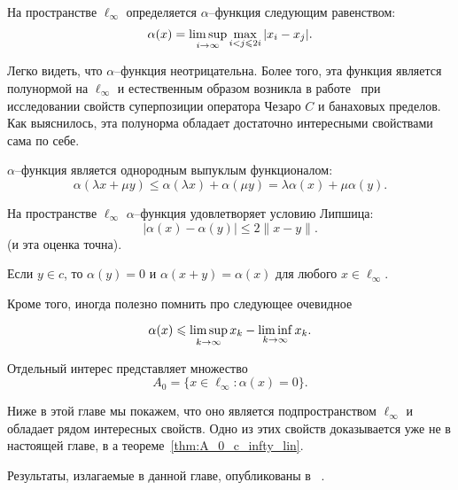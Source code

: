 На пространстве $\ell_\infty$ определяется $\alpha$--функция следующим равенством:
\begin{equation}
	\alpha(x) = \varlimsup_{i\to\infty} \max_{i<j\leqslant 2i} |x_i - x_j|
	.
\end{equation}

Легко видеть, что $\alpha$--функция неотрицательна.
Более того, эта функция является полунормой на $\ell_\infty$
и естественным образом возникла в работе~\cite[\S 2]{semenov2020invariant_noncommutative}
при исследовании свойств суперпозиции оператора Чезаро $C$ и банаховых пределов.
Как выяснилось, эта полунорма обладает достаточно интересными свойствами сама по себе.


\begin{property}
	\label{thm:alpha_x_triangle_ineq}
	$\alpha$--функция является однородным выпуклым функционалом:
	\begin{equation}
		\alpha(\lambda x+ \mu y)
		\leq
		 \alpha(\lambda x) + \alpha(\mu y) = \lambda \alpha(x) + \mu \alpha(y)
		.
	\end{equation}
\end{property}

\begin{property}
	На пространстве $\ell_\infty$ $\alpha$--функция удовлетворяет условию Липшица:
	\begin{equation}\label{alpha_Lipshitz}
		|\alpha(x) - \alpha(y)| \leq 2 \|x-y\|
		.
	\end{equation}
	(и эта оценка точна).
\end{property}

\begin{property}
	Если $y\in c$, то $\alpha(y) = 0$ и $\alpha(x+y) = \alpha(x)$ для любого $x \in \ell_\infty$.
\end{property}

Кроме того, иногда полезно помнить про следующее очевидное
\begin{property}
	\label{thm:alpha_x_leq_limsup_minus_liminf}
	\begin{equation}
		\alpha(x) \leq \varlimsup_{k\to\infty} x_k - \varliminf_{k\to\infty} x_k
		.
	\end{equation}
\end{property}

Отдельный интерес представляет множество
\begin{equation}
	A_0 = \{x\in\ell_\infty : \alpha(x) = 0\}
	.
\end{equation}

Ниже в этой главе мы покажем, что оно является подпространством $\ell_\infty$ и обладает рядом интересных свойств.
Одно из этих свойств доказывается уже не в настоящей главе, в а теореме~\ref{thm:A_0_c_infty_lin}.

Результаты, излагаемые в данной главе, опубликованы в%
~\cite{
our-mz2019ac0,
our-mz2021linearhulls,
avdeev2021vestnik,
our-ped-2018-alpha-Tx,
our-vzms-2018,
}.
